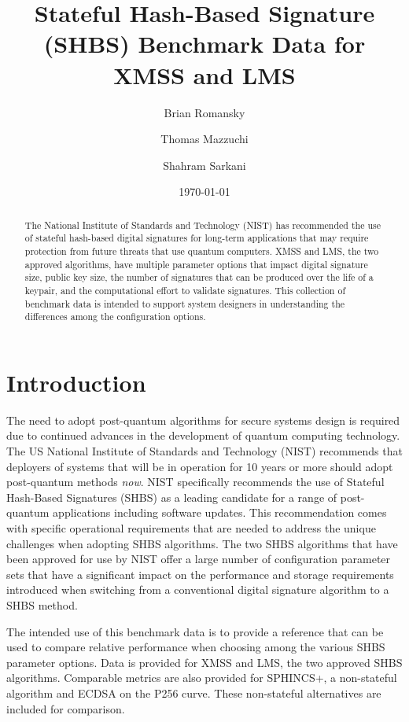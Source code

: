 \documentclass{article}
\title{Stateful Hash-Based Signature (SHBS) Benchmark Data for XMSS and LMS}
\author{
  Brian Romansky \and
  Thomas Mazzuchi \and
  Shahram Sarkani
}
\date{\today}
\begin{document}
\maketitle

\begin{abstract}
  The National Institute of Standards and Technology (NIST) has recommended the use of stateful hash-based digital signatures for long-term applications that may require protection from future threats that use quantum computers.  XMSS and LMS, the two approved algorithms, have multiple parameter options that impact digital signature size, public key size, the number of signatures that can be produced over the life of a keypair, and the computational effort to validate signatures.  This collection of benchmark data is intended to support system designers in understanding the differences among the configuration options.
\end{abstract}


\section{Introduction}
The need to adopt post-quantum algorithms for secure systems design is required due to continued advances in the development of quantum computing technology.  The US National Institute of Standards and Technology (NIST) recommends that deployers of systems that will be in operation for 10 years or more should adopt post-quantum methods \emph{now}.  NIST specifically recommends the use of Stateful Hash-Based Signatures (SHBS) as a leading candidate for a range of post-quantum applications including software updates.\cite{800-208}  This recommendation comes with specific operational requirements that are needed to address the unique challenges when adopting SHBS algorithms.\cite{NSA-CNSA-2022r2}  The two SHBS algorithms that have been approved for use by NIST offer a large number of configuration parameter sets that have a significant impact on the performance and storage requirements introduced when switching from a conventional digital signature algorithm to a SHBS method.

The intended use of this benchmark data is to provide a reference that can be used to compare relative performance when choosing among the various SHBS parameter options.  Data is provided for XMSS and LMS, the two approved SHBS algorithms.  Comparable metrics are also provided for SPHINCS+, a non-stateful algorithm and ECDSA on the P256 curve.  These non-stateful alternatives are included for comparison.
\end{document}
